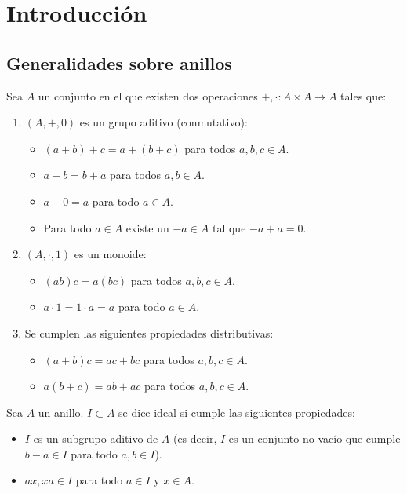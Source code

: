\section{Introducción}
\subsection{Generalidades sobre anillos}
\begin{df}[Anillo]
  Sea \(A\) un conjunto en el que existen dos operaciones
  \(+,\cdot:A\times A\longrightarrow A\) tales que:
  \begin{enumerate}
    \item \((A, +,0)\) es un grupo aditivo (conmutativo):
      \begin{itemize}
        \item \((a+b)+c=a+(b+c)\) para todos \(a,b,c\in A\).
        \item \(a+b=b+a\) para todos \(a,b\in A\).
        \item \(a+0=a\) para todo \(a\in A\).
        \item Para todo \(a\in A\) existe un \(-a\in A\)
          tal que \(-a+a=0\).
      \end{itemize}
    \item \((A, \cdot, 1)\) es un monoide:
      \begin{itemize}
        \item \((ab)c=a(bc)\) para todos \(a,b,c\in A\).
        \item \(a\cdot 1=1\cdot a=a\) para todo \(a\in A\).
      \end{itemize}
    \item Se cumplen las siguientes propiedades distributivas:
      \begin{itemize}
        \item \((a+b)c=ac+bc\) para todos \(a,b,c\in A\).
        \item \(a(b+c)=ab+ac\) para todos \(a,b,c\in A\).
      \end{itemize}
     \end{enumerate}
  \end{df}

  \begin{df}[Idelaes]
    Sea \(A\) un anillo. \(I\subset A\) se dice ideal si cumple las
    siguientes propiedades:
    \begin{itemize}
      \item \(I\) es un subgrupo aditivo de \(A\) (es decir,
        \(I\) es un conjunto no vacío que cumple
        \(b-a\in I\) para todo \(a, b\in I\)).
      \item \(ax, xa\in I\) para todo \(a\in I\) y \(x \in A\).
    \end{itemize}
  \end{df}

